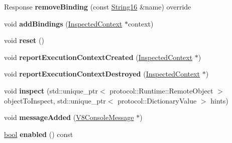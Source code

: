 \begin{DoxyCompactItemize}
Response {\bfseries remove\+Binding} (const \mbox{\hyperlink{classv8__inspector_1_1String16}{String16}} \&name) override
\item 
\mbox{\label{classv8__inspector_1_1V8RuntimeAgentImpl_a62b07b511ea8bd42fbcb22a75c964a5a}} 
void {\bfseries add\+Bindings} (\mbox{\hyperlink{classv8__inspector_1_1InspectedContext}{Inspected\+Context}} $\ast$context)
\item 
\mbox{\label{classv8__inspector_1_1V8RuntimeAgentImpl_ae4867e1e4cd63621c811a9b417d8c89d}} 
void {\bfseries reset} ()
\item 
\mbox{\label{classv8__inspector_1_1V8RuntimeAgentImpl_aace31c26bd280cc8cb4bbe8c3dd10673}} 
void {\bfseries report\+Execution\+Context\+Created} (\mbox{\hyperlink{classv8__inspector_1_1InspectedContext}{Inspected\+Context}} $\ast$)
\item 
\mbox{\label{classv8__inspector_1_1V8RuntimeAgentImpl_a2655deb993c74d4b92c99717f02f3132}} 
void {\bfseries report\+Execution\+Context\+Destroyed} (\mbox{\hyperlink{classv8__inspector_1_1InspectedContext}{Inspected\+Context}} $\ast$)
\item 
\mbox{\label{classv8__inspector_1_1V8RuntimeAgentImpl_a056c2133994d480e6e523dcdca23855e}} 
void {\bfseries inspect} (std\+::unique\+\_\+ptr$<$ protocol\+::\+Runtime\+::\+Remote\+Object $>$ object\+To\+Inspect, std\+::unique\+\_\+ptr$<$ protocol\+::\+Dictionary\+Value $>$ hints)
\item 
\mbox{\label{classv8__inspector_1_1V8RuntimeAgentImpl_a360f46c160f4dd43af0910cc22bb0d3d}} 
void {\bfseries message\+Added} (\mbox{\hyperlink{classv8__inspector_1_1V8ConsoleMessage}{V8\+Console\+Message}} $\ast$)
\item 
\mbox{\label{classv8__inspector_1_1V8RuntimeAgentImpl_a2dc113d53d050a1656c12b74b883387b}} 
\mbox{\hyperlink{classbool}{bool}} {\bfseries enabled} () const
\end{DoxyCompactItemize}


